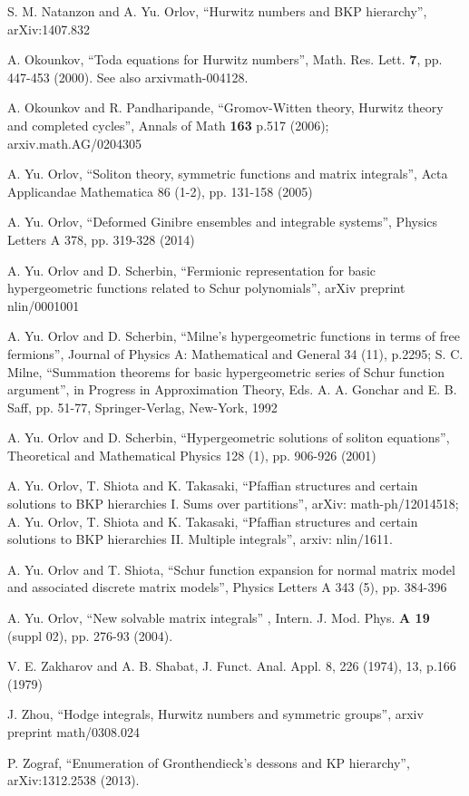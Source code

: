 \documentclass[a4paper,10pt]{article}
\theoremstyle{plain}
\theoremstyle{remark}
\begin{document}
\begin{thebibliography}{99}
  S. M. Natanzon and A. Yu. Orlov, ``Hurwitz numbers and BKP hierarchy'',
    arXiv:1407.832
 
 A. Okounkov, ``Toda equations for Hurwitz numbers'', { Math. Res. Lett.} {\bf 7}, pp. 447-453 (2000).
See also arxiv{math-004128}.

 A. Okounkov and R. Pandharipande, ``Gromov-Witten theory, Hurwitz theory and completed cycles'',
Annals of Math {\bf 163} p.517 (2006); arxiv.math.AG/0204305


A. Yu. Orlov, ``Soliton theory, symmetric functions and matrix integrals'',
Acta Applicandae Mathematica 86 (1-2), pp. 131-158 (2005)

 A. Yu. Orlov, ``Deformed Ginibre ensembles and integrable systems'',
Physics Letters A 378, pp. 319-328 (2014)

 A. Yu. Orlov and D. Scherbin, ``Fermionic representation for basic hypergeometric functions related to
Schur polynomials'', arXiv preprint nlin/0001001

 A. Yu. Orlov and D. Scherbin, ``Milne's hypergeometric functions in terms of free fermions'',
Journal of Physics A: Mathematical and General 34 (11), p.2295;
S. C. Milne, ``Summation theorems for basic hypergeometric series of Schur function argument'',
in Progress in Approximation Theory, Eds. A. A. Gonchar and E. B. Saff, pp.
51-77, Springer-Verlag, New-York, 1992

 A. Yu. Orlov and D. Scherbin,
``Hypergeometric solutions of soliton equations'',
Theoretical and Mathematical Physics 128 (1), pp. 906-926 (2001)

 A. Yu. Orlov, T. Shiota and K. Takasaki, ``Pfaffian structures and certain solutions to
  BKP hierarchies I. Sums over partitions'', arXiv: math-ph/12014518; A. Yu. Orlov, T. Shiota and K. Takasaki,
  ``Pfaffian structures and certain solutions to  BKP hierarchies II. Multiple integrals'', arxiv: nlin/1611.

 A. Yu. Orlov and T. Shiota, ``Schur function expansion for normal matrix model and associated
discrete matrix models'', Physics Letters A 343 (5), pp. 384-396

 A. Yu. Orlov, ``New solvable matrix integrals'' ,
{  Intern.  J. Mod. Phys.} {\bf  A 19 } (suppl 02), pp. 276-93  (2004).


 V. E. Zakharov and A. B. Shabat,
J. Funct. Anal. Appl. 8, 226 (1974), 13, p.166 (1979)

 J. Zhou, ``Hodge integrals, Hurwitz numbers and symmetric groups'', arxiv preprint math/0308.024

 P. Zograf, ``Enumeration of Gronthendieck's dessons and KP hierarchy'',  arXiv:1312.2538 (2013).


\end{thebibliography}
\end{document}
